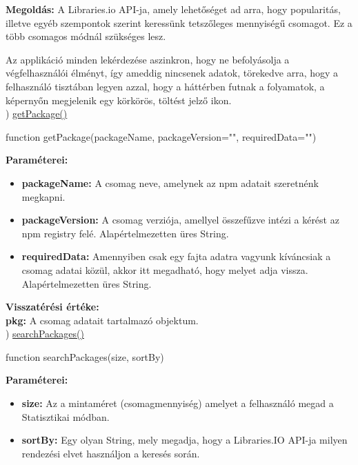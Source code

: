 \textbf{Megoldás:} A Libraries.io API-ja, amely lehetőséget ad arra, hogy popularitás, illetve egyéb szempontok szerint keressünk tetszőleges mennyiségű csomagot. Ez a több csomagos módnál szükséges lesz.

Az applikáció minden lekérdezése aszinkron, hogy ne befolyásolja a végfelhasználói élményt, így ameddig nincsenek adatok, törekedve arra, hogy a felhasználó tisztában legyen azzal, hogy a háttérben futnak a folyamatok, a képernyőn megjelenik egy körkörös, töltést jelző ikon.\\

) \underline{getPackage()}\\

\begin{js}
function getPackage(packageName, packageVersion="", requiredData="")
\end{js}

\noindent \textbf{Paraméterei:}

\begin{itemize}
	\item \textbf{packageName:} A csomag neve, amelynek az npm adatait szeretnénk megkapni.
	\item \textbf{packageVersion:} A csomag verziója, amellyel összefűzve intézi a kérést az npm registry felé. Alapértelmezetten üres String.
	\item \textbf{requiredData:} Amennyiben csak egy fajta adatra vagyunk kíváncsiak a csomag adatai közül, akkor itt megadható, hogy melyet adja vissza. Alapértelmezetten üres String.
\end{itemize}

\noindent \textbf{Visszatérési értéke:} \\

\textbf{pkg:} A csomag adatait tartalmazó objektum.\\

) \underline{searchPackages()}\\

\begin{js}
function searchPackages(size, sortBy)
\end{js}

\noindent \textbf{Paraméterei:}

\begin{itemize}
	\item \textbf{size:} Az a mintaméret (csomagmennyiség) amelyet a felhasználó megad a Statisztikai módban.
	\item \textbf{sortBy:} Egy olyan String, mely megadja, hogy a Libraries.IO API-ja milyen rendezési elvet használjon a keresés során. 
\end{itemize}

